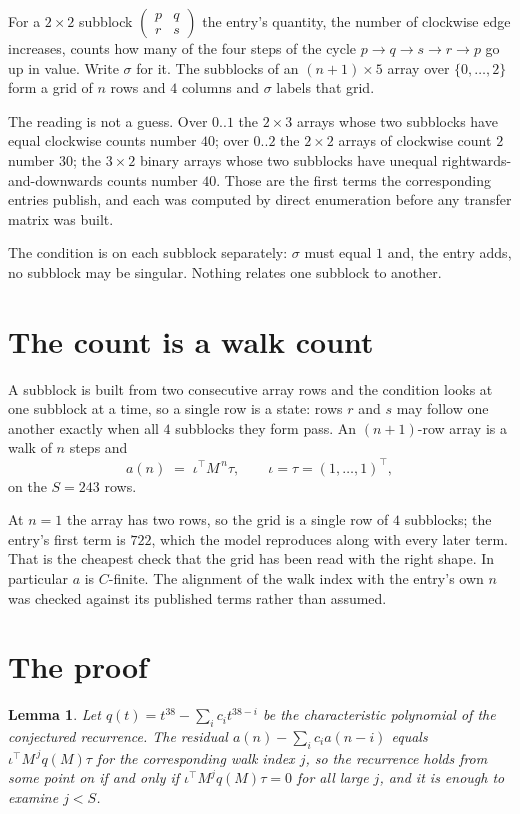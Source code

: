 \documentclass[11pt,a4paper]{article}
\theoremstyle{plain}
\newtheorem{lemma}[theorem]{Lemma}
\theoremstyle{definition}
\begin{document}
For a $2\times2$ subblock $\begin{pmatrix}p&q\\r&s\end{pmatrix}$ the
entry's quantity, the number of clockwise edge increases, counts how many of the four steps of the cycle $p\to q\to s\to r\to p$ go up in value. Write $\sigma$ for it. The subblocks of an
$(n+1)\times5$ array over $\{0,\dots,2\}$ form a grid of $n$ rows and $4$
columns and $\sigma$ labels that grid.

The reading is not a guess. Over $0..1$ the $2\times3$ arrays whose two subblocks have equal
clockwise counts number $40$; over $0..2$ the $2\times2$ arrays of clockwise count $2$ number
$30$; the $3\times2$ binary arrays whose two subblocks have unequal rightwards-and-downwards
counts number $40$. Those are the first terms the corresponding entries publish, and each was
computed by direct enumeration before any transfer matrix was built.

The condition is on each subblock separately: $\sigma$ must equal $1$ and, the entry adds, no subblock may be singular. Nothing
relates one subblock to another.

\section{The count is a walk count}

A subblock is built from two consecutive array rows and the condition looks
at one subblock at a time, so a single row is a state: rows $r$ and $s$ may follow one another
exactly when all $4$ subblocks they form pass. An $(n+1)$-row array is a walk of $n$ steps and
\[
a(n)\;=\;\iota^{\!\top}M^{\,n}\tau,\qquad\iota=\tau=(1,\dots,1)^{\!\top},
\]
on the $S=243$ rows.

At $n=1$ the array has two rows, so the grid is a single row of $4$
subblocks; the entry's first term is $722$, which the model
reproduces along with every later term. That is the cheapest check that the grid has been read
with the right shape.
In particular $a$ is $C$-finite. The alignment of the walk index with the entry's own $n$ was
checked against its published terms rather than assumed.

\section{The proof}

\begin{lemma}\label{lem:crit}
Let $q(t)=t^{38}-\sum_i c_it^{38-i}$ be the characteristic polynomial of the
conjectured recurrence. The residual $a(n)-\sum_ic_ia(n-i)$ equals
$\iota^{\!\top}M^{\,j}q(M)\tau$ for the corresponding walk index $j$, so the recurrence
holds from some point on if and only if $\iota^{\!\top}M^{j}q(M)\tau=0$ for all large $j$,
and it is enough to examine $j<S$.
\end{lemma}
\end{document}
